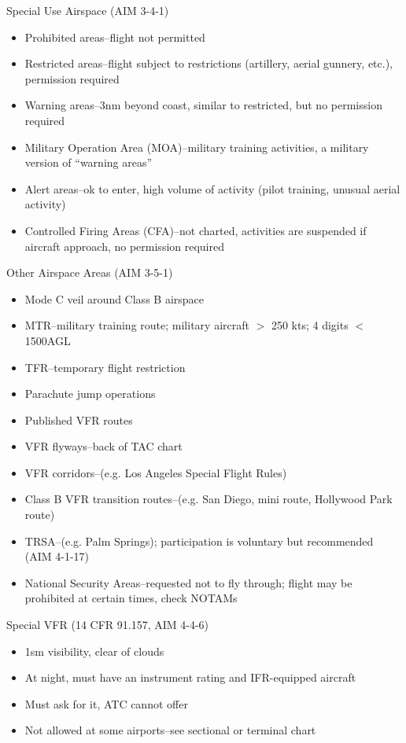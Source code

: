 Special Use Airspace (AIM 3-4-1)
\begin{itemize}
  \item Prohibited areas--flight not permitted
  \item Restricted areas--flight subject to restrictions (artillery, aerial
    gunnery, etc.), permission required
  \item Warning areas--3nm beyond coast, similar to restricted, but no
    permission required
  \item Military Operation Area (MOA)--military training activities, a military
    version of ``warning areas''
  \item Alert areas--ok to enter, high volume of activity (pilot training,
    unusual aerial activity)
  \item Controlled Firing Areas (CFA)--not charted, activities are suspended if
    aircraft approach, no permission required
\end{itemize}

Other Airspace Areas (AIM 3-5-1)
\begin{itemize}
  \item Mode C veil around Class B airspace
  \item MTR--military training route; military aircraft $>$ 250 kts; 4 digits $<$
    1500AGL
  \item TFR--temporary flight restriction
  \item Parachute jump operations
  \item Published VFR routes
  \item VFR flyways--back of TAC chart
  \item VFR corridors--(e.g. Los Angeles Special Flight Rules)
  \item Class B VFR transition routes--(e.g. San Diego, mini route, Hollywood
    Park route)
  \item TRSA--(e.g. Palm Springs); participation is voluntary but recommended
    (AIM 4-1-17)
  \item National Security Areas--requested not to fly through; flight may be
    prohibited at certain times, check NOTAMs
\end{itemize}

Special VFR (14 CFR 91.157, AIM 4-4-6)
\begin{itemize}
  \item 1sm visibility, clear of clouds
  \item At night, must have an instrument rating and IFR-equipped aircraft
  \item Must ask for it, ATC cannot offer
  \item Not allowed at some airports--see sectional or terminal chart
\end{itemize}

